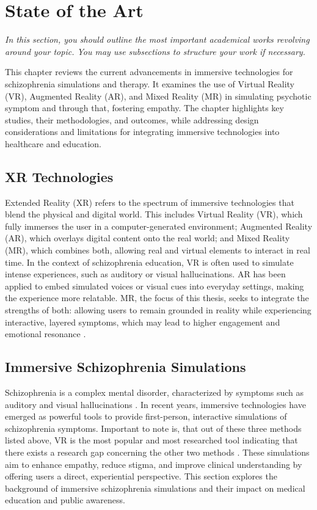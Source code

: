 \chapter{State of the Art}
\label{ch:background}

\emph{In this section, you should outline the most important academical works revolving around your topic. You may use subsections to structure your work if necessary.}

This chapter reviews the current advancements in immersive technologies for schizophrenia simulations and therapy. It examines the use of Virtual Reality (VR), Augmented Reality (AR), and Mixed Reality (MR) in simulating psychotic symptom and through that, fostering empathy. The chapter highlights key studies, their methodologies, and outcomes, while addressing design considerations and limitations for integrating immersive technologies into healthcare and education.

\section{XR Technologies}
Extended Reality (XR) refers to the spectrum of immersive technologies that blend the physical and digital world. This includes Virtual Reality (VR), which fully immerses the user in a computer-generated environment; Augmented Reality (AR), which overlays digital content onto the real world; and Mixed Reality (MR), which combines both, allowing real and virtual elements to interact in real time. In the context of schizophrenia education, VR is often used to simulate intense experiences, such as auditory or visual hallucinations. AR has been applied to embed simulated voices or visual cues into everyday settings, making the experience more relatable. MR, the focus of this thesis, seeks to integrate the strengths of both: allowing users to remain grounded in reality while experiencing interactive, layered symptoms, which may lead to higher engagement and emotional resonance \cite{Krogmeier2024, Silva2017, Zare-Bidaki2022}.

\section{Immersive Schizophrenia Simulations}
Schizophrenia is a complex mental disorder, characterized by symptoms such as auditory and visual hallucinations \cite{Silverstein2021}. In recent years, immersive technologies have emerged as powerful tools to provide first-person, interactive simulations of schizophrenia symptoms. Important to note is, that out of these three methods listed above, VR is the most popular and most researched tool indicating that there exists a research gap concerning the other two methods \cite{Kuhail2022}. These simulations aim to enhance empathy, reduce stigma, and improve clinical understanding by offering users a direct, experiential perspective. This section explores the background of immersive schizophrenia simulations and their impact on medical education and public awareness.

